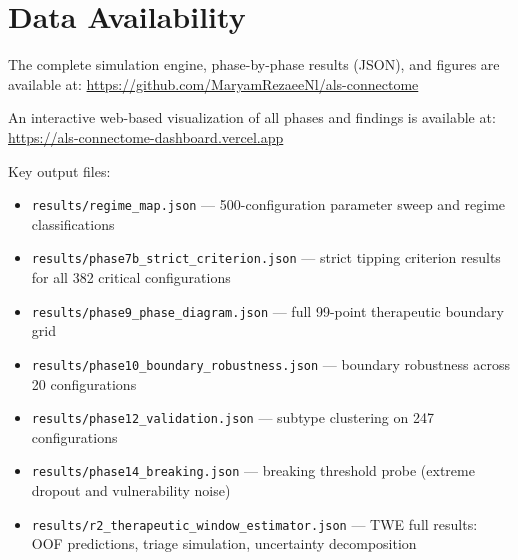 \documentclass[12pt,a4paper]{article}
\begin{document}
\clearpage
\section*{Data Availability}

The complete simulation engine, phase-by-phase results (JSON), and figures are available at:
\url{https://github.com/MaryamRezaeeNl/als-connectome}

An interactive web-based visualization of all phases and findings is available at:
\url{https://als-connectome-dashboard.vercel.app}

Key output files:
\begin{itemize}
\item \texttt{results/regime\_map.json} --- 500-configuration parameter sweep and regime classifications
\item \texttt{results/phase7b\_strict\_criterion.json} --- strict tipping criterion results for all 382 critical configurations
\item \texttt{results/phase9\_phase\_diagram.json} --- full 99-point therapeutic boundary grid
\item \texttt{results/phase10\_boundary\_robustness.json} --- boundary robustness across 20 configurations
\item \texttt{results/phase12\_validation.json} --- subtype clustering on 247 configurations
\item \texttt{results/phase14\_breaking.json} --- breaking threshold probe (extreme dropout and vulnerability noise)
\item \texttt{results/r2\_therapeutic\_window\_estimator.json} --- TWE full results: OOF predictions, triage simulation, uncertainty decomposition
\end{itemize}



\end{document}
